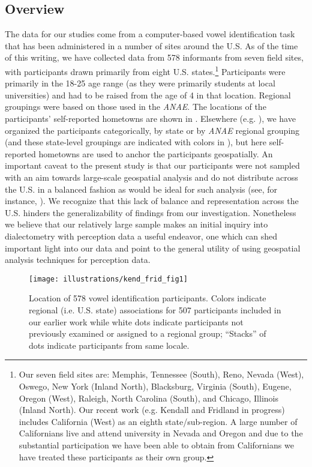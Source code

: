 \documentclass[output=paper]{LSP/langsci}
\begin{document}
\subsection{Overview}
The data for our studies come from a computer-based vowel identification task that has been administered in a number of sites around the U.S. As of the time of this writing, we have collected data from 578 informants from seven field sites, with participants drawn primarily from eight U.S. states.\footnote{Our seven field sites are: Memphis, Tennessee (South), Reno, Nevada (West), Oswego, New York (Inland North), Blacksburg, Virginia (South), Eugene, Oregon (West), Raleigh, North Carolina (South), and Chicago, Illinois (Inland North). Our recent work (e.g. Kendall and Fridland in progress) includes California (West) as an eighth state/sub-region. A large number of Californians live and attend university in Nevada and Oregon and due to the substantial participation we have been able to obtain from Californians we have treated these participants as their own group.} Participants were primarily in the 18-25 age range (as they were primarily students at local universities) and had to be raised from the age of 4 in that location. Regional groupings were based on those used in the \textit{ANAE}. The locations of the participants’ self-reported hometowns are shown in . Elsewhere (e.g. \citealt{fridland_exploring_2012}), we have organized the participants categorically, by state or by \textit{ANAE} regional grouping (and these state-level groupings are indicated with colors in ), but here self-reported hometowns are used to anchor the participants geospatially. An important caveat to the present study is that our participants were not sampled with an aim towards large-scale geospatial analysis and do not distribute across the U.S. in a balanced fashion as would be ideal for such analysis (see, for instance, \citealt{grieve_corpus-based_2009}). We recognize that this lack of balance and representation across the U.S. hinders the generalizability of findings from our investigation. Nonetheless we believe that our relatively large sample makes an initial inquiry into dialectometry with perception data a useful endeavor, one which can shed important light into our data and point to the general utility of using geospatial analysis techniques for perception data.

\begin{figure}
\texttt{[image: illustrations/kend\_frid\_fig1]}
\caption{Location of 578 vowel identification participants. Colors indicate regional (i.e. U.S. state) associations for 507 participants included in our earlier work while white dots indicate participants not previously examined or assigned to a regional group; ``Stacks'' of dots indicate participants from same locale.}
\label{fig:1}
\end{figure}
\end{document}
